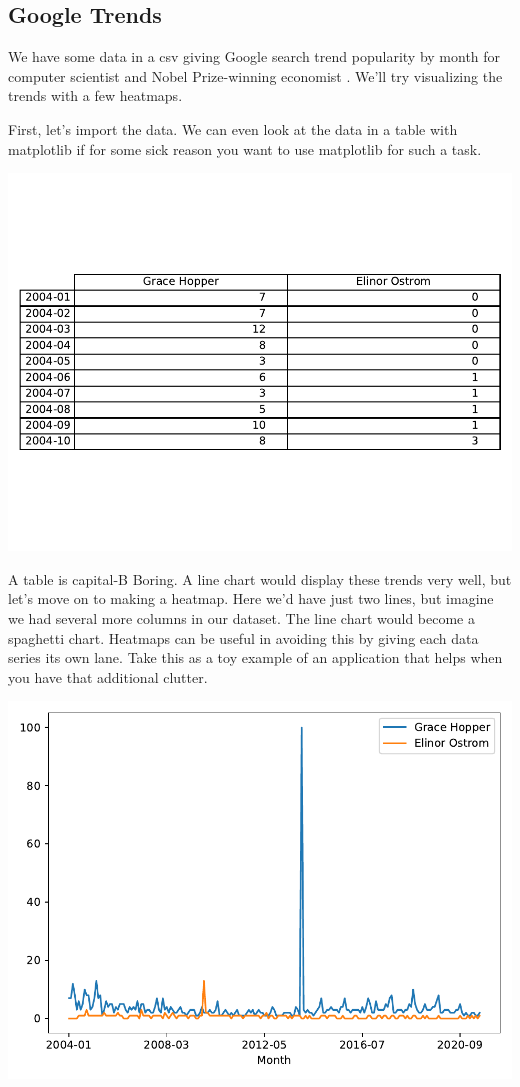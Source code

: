 \subsection{Google Trends}

We have some data in a csv giving Google search trend popularity by month for computer scientist  and Nobel Prize-winning economist . We'll try visualizing the trends with a few heatmaps.

First, let's import the data. We can even look at the data in a table with matplotlib if for some sick reason you want to use matplotlib for such a task.


\begin{center}
    \includegraphics[width = .8\textwidth]{figures/poetryplots/mpl-table.pdf}
\end{center}

A table is capital-B Boring. A  line chart would display these trends very well, but let's move on to making a heatmap. Here we'd have just two lines, but imagine we had several more columns in our dataset. The line chart would become a spaghetti chart. Heatmaps can be useful in avoiding this by giving each data series its own lane. Take this as a toy example of an application that helps when you have that additional clutter. 

\begin{center}
    \includegraphics[width = .8\textwidth]{figures/poetryplots/df-plot.pdf}
\end{center}

